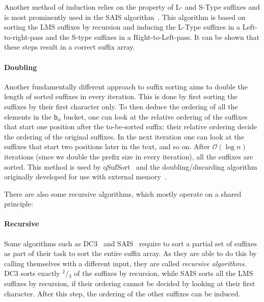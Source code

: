 Another method of induction relies on the property of L- and S-Type suffixes and
is most prominently used in the SAIS algorithm~\cite{saca:6}.
This algorithm is based on sorting the LMS suffixes by recursion
and inducing the L-Type suffixes in a Left-to-right-pass and the S-type suffixes in a Right-to-Left-pass.
It can be shown that these steps result in a correct suffix array.

\paragraph{Doubling} Another fundamentally different approach to suffix sorting
aims to double the length of sorted suffixes in every iteration.
This is done by first sorting the suffixes by their first character only.
To then deduce the ordering of all the elements in the $\mathsf b_\alpha$ bucket,
one can look at the relative ordering of the suffixes that start one position
after the to-be-sorted suffix:
their relative ordering decide the ordering of the original suffixes.
In the next iteration one can look at the suffixes that start two positions later in the text,
and so on.
After $\mathcal O(\log n)$ iterations (since we double the prefix size in every iteration),
all the suffixes are sorted.
This method is used by qSufSort~\cite{saca:1} and the
doubling/discarding algorithm originally developed for use with external memory~\cite{saca:11}.

\bigskip

There are also some recursive algorithms, which mostly operate on a shared principle:
%
\paragraph{Recursive} Some algorithms such as DC3~\cite{saca:9} and SAIS~\cite{saca:6} require to sort a
partial set of suffixes as part of their task to sort the entire suffix array.
As they are able to do this by calling themselves with a different input, they are called \emph{recursive algorithms}.
DC3 sorts exactly $^2\!/\!_3$ of the suffixes by recursion, while SAIS sorts all the LMS suffixes by recursion,
if their ordering cannot be decided by looking at their first character.
After this step, the ordering of the other suffixes can be induced.

